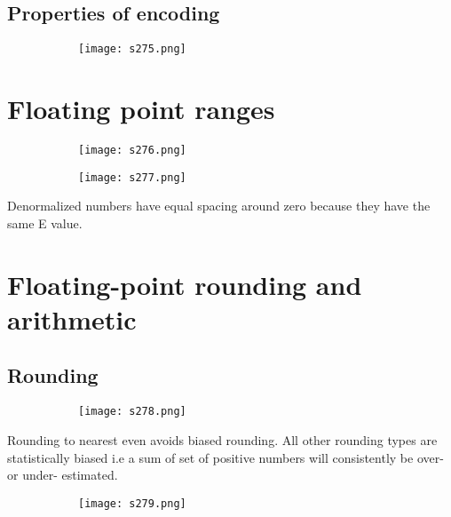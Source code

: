 \documentclass[8pt]{extreport}
\begin{document}
\subsection{Properties of encoding}
\begin{figure}[H]
\centering
\begin{subfigure}[b]{0.4\linewidth}
\texttt{[image: s275.png]}
\end{subfigure}
\end{figure}

\section{Floating point ranges}
\begin{figure}[H]
\centering
\begin{subfigure}[b]{0.4\linewidth}
\texttt{[image: s276.png]}
\end{subfigure}
\begin{subfigure}[b]{0.4\linewidth}
\texttt{[image: s277.png]}
\end{subfigure}
\end{figure}
Denormalized numbers have equal spacing around zero because they have the same E value.

\section{Floating-point rounding and arithmetic}


\subsection{Rounding}
\begin{figure}[H]
\centering
\begin{subfigure}[b]{0.4\linewidth}
\texttt{[image: s278.png]}
\end{subfigure}
\end{figure}
Rounding to nearest even avoids biased rounding. All other rounding types are statistically biased i.e a sum of set of positive numbers will consistently be over- or under- estimated.
\begin{figure}[H]
\centering
\begin{subfigure}[b]{0.4\linewidth}
\texttt{[image: s279.png]}
\end{subfigure}
\end{figure}
\end{document}

